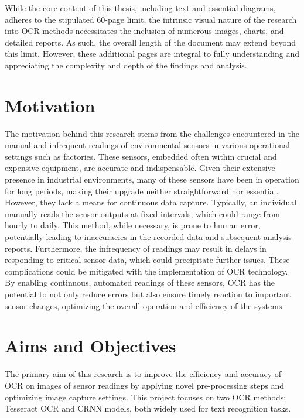 While the core content of this thesis, including text and essential diagrams, adheres to the stipulated 60-page limit, the intrinsic visual nature of the research into OCR methods necessitates the inclusion of numerous images, charts, and detailed reports. As such, the overall length of the document may extend beyond this limit. However, these additional pages are integral to fully understanding and appreciating the complexity and depth of the findings and analysis.

\newpage

\section{Motivation}

The motivation behind this research stems from the challenges encountered in the manual and infrequent readings of environmental sensors in various operational settings such as factories. These sensors, embedded often within crucial and expensive equipment, are accurate and indispensable. Given their extensive presence in industrial environments, many of these sensors have been in operation for long periods, making their upgrade neither straightforward nor essential. However, they lack a means for continuous data capture. Typically, an individual manually reads the sensor outputs at fixed intervals, which could range from hourly to daily. This method, while necessary, is prone to human error, potentially leading to inaccuracies in the recorded data and subsequent analysis reports. Furthermore, the infrequency of readings may result in delays in responding to critical sensor data, which could precipitate further issues. These complications could be mitigated with the implementation of OCR technology. By enabling continuous, automated readings of these sensors, OCR has the potential to not only reduce errors but also ensure timely reaction to important sensor changes, optimizing the overall operation and efficiency of the systems.

\section{Aims and Objectives}
The primary aim of this research is to improve the efficiency and accuracy of OCR on images of sensor readings by applying novel pre-processing steps and optimizing image capture settings. This project focuses on two OCR methods: Tesseract OCR and CRNN models, both widely used for text recognition tasks.

